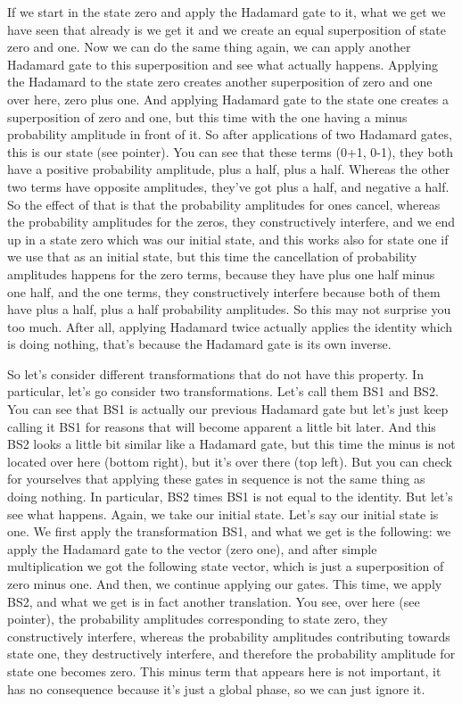 If we start in the state zero and apply the Hadamard gate to it, what we get we have seen that already is we get it and we create an equal superposition of state zero and one. Now we can do the same thing again, we can apply another Hadamard gate to this superposition and see what actually happens. Applying the Hadamard to the state zero creates another superposition of zero and one over here, zero plus one. And applying Hadamard gate to the state one creates a superposition of zero and one, but this time with the one having a minus probability amplitude in front of it. So after applications of two Hadamard gates, this is our state (see pointer). You can see that these terms (0+1, 0-1), they both have a positive probability amplitude, plus a half, plus a half. Whereas the other two terms have opposite amplitudes, they've got plus a half, and negative a half. So the effect of that is that the probability amplitudes for ones cancel, whereas the probability amplitudes for the zeros, they constructively interfere, and we end up in a state zero which was our initial state, and this works also for state one if we use that as an initial state, but this time the cancellation of probability amplitudes happens for the zero terms, because they have plus one half minus one half, and the one terms, they constructively interfere because both of them have plus a half, plus a half probability amplitudes. So this may not surprise you too much. After all, applying Hadamard twice actually applies the identity which is doing nothing, that's because the Hadamard gate is its own inverse.

So let's consider different transformations that do not have this property. In particular, let's go consider two transformations. Let's call them BS1 and BS2. You can see that BS1 is actually our previous Hadamard gate but let's just keep calling it BS1 for reasons that will become apparent a little bit later. And this BS2 looks a little bit similar like a Hadamard gate, but this time the minus is not located over here (bottom right), but it's over there (top left). But you can check for yourselves that applying these gates in sequence is not the same thing as doing nothing. In particular, BS2 times BS1 is not equal to the identity. But let's see what happens. Again, we take our initial state. Let's say our initial state is one. We first apply the transformation BS1, and what we get is the following: we apply the Hadamard gate to the vector (zero one), and after simple multiplication we got the following state vector, which is just a superposition of zero minus one. And then, we continue applying our gates. This time, we apply BS2, and what we get is in fact another translation. You see, over here (see pointer), the probability amplitudes corresponding to state zero, they constructively interfere, whereas the probability amplitudes contributing towards state one, they destructively interfere, and therefore the probability amplitude for state one becomes zero. This minus term that appears here is not important, it has no consequence because it's just a global phase, so we can just ignore it.


